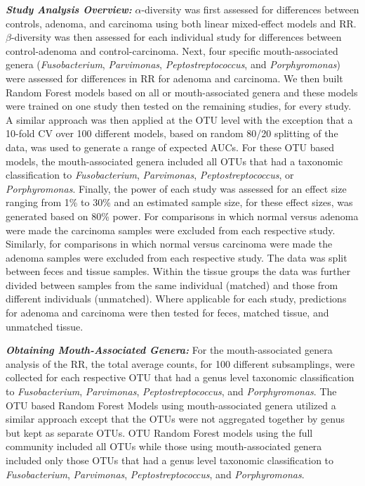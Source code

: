 \documentclass[12pt,]{article}
\begin{document}
\textbf{\emph{Study Analysis Overview:}} \(\alpha\)-diversity was first
assessed for differences between controls, adenoma, and carcinoma using
both linear mixed-effect models and RR. \(\beta\)-diversity was then
assessed for each individual study for differences between
control-adenoma and control-carcinoma. Next, four specific
mouth-associated genera (\emph{Fusobacterium}, \emph{Parvimonas},
\emph{Peptostreptococcus}, and \emph{Porphyromonas}) were assessed for
differences in RR for adenoma and carcinoma. We then built Random Forest
models based on all or mouth-associated genera and these models were
trained on one study then tested on the remaining studies, for every
study. A similar approach was then applied at the OTU level with the
exception that a 10-fold CV over 100 different models, based on random
80/20 splitting of the data, was used to generate a range of expected
AUCs. For these OTU based models, the mouth-associated genera included
all OTUs that had a taxonomic classification to \emph{Fusobacterium},
\emph{Parvimonas}, \emph{Peptostreptococcus}, or \emph{Porphyromonas}.
Finally, the power of each study was assessed for an effect size ranging
from 1\% to 30\% and an estimated sample size, for these effect sizes,
was generated based on 80\% power. For comparisons in which normal
versus adenoma were made the carcinoma samples were excluded from each
respective study. Similarly, for comparisons in which normal versus
carcinoma were made the adenoma samples were excluded from each
respective study. The data was split between feces and tissue samples.
Within the tissue groups the data was further divided between samples
from the same individual (matched) and those from different individuals
(unmatched). Where applicable for each study, predictions for adenoma
and carcinoma were then tested for feces, matched tissue, and unmatched
tissue.

\textbf{\emph{Obtaining Mouth-Associated Genera:}} For the
mouth-associated genera analysis of the RR, the total average counts,
for 100 different subsamplings, were collected for each respective OTU
that had a genus level taxonomic classification to \emph{Fusobacterium},
\emph{Parvimonas}, \emph{Peptostreptococcus}, and \emph{Porphyromonas}.
The OTU based Random Forest Models using mouth-associated genera
utilized a similar approach except that the OTUs were not aggregated
together by genus but kept as separate OTUs. OTU Random Forest models
using the full community included all OTUs while those using
mouth-associated genera included only those OTUs that had a genus level
taxonomic classification to \emph{Fusobacterium}, \emph{Parvimonas},
\emph{Peptostreptococcus}, and \emph{Porphyromonas}.
\end{document}
